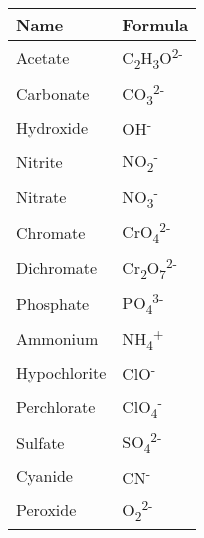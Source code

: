 \documentclass[12pt]{article}
\newcommand\p[1]{\textsuperscript{#1}}
\renewcommand\b[1]{\textsubscript{#1}}
\begin{document}
\begin{tabular} {l l}
	\toprule
	\textbf{Name} & \textbf{Formula} \\ \midrule
	Acetate              & C\b{2}H\b{3}O\p{2-}    \\
	Carbonate            & CO\b{3}\p{2-}   \\
	Hydroxide            & OH\p{-}        \\
	Nitrite              & NO\b{2}\p{-}       \\
	Nitrate              & NO\b{3}\p{-}       \\
	Chromate             & CrO\b{4}\p{2-}  \\
	Dichromate           & Cr\b{2}O\b{7}\p{2-} \\
	Phosphate            & PO\b{4}\p{3-}   \\
	Ammonium             & NH\b{4}\p{+}       \\
	Hypochlorite         & ClO\p{-}       \\
	Perchlorate          & ClO\b{4}\p{-}      \\
	Sulfate              & SO\b{4}\p{2-}   \\
	Cyanide              & CN\p{-}        \\
	Peroxide             & O\b{2}\p{2-}    \\
	\bottomrule
\end{tabular}
\end{document}
